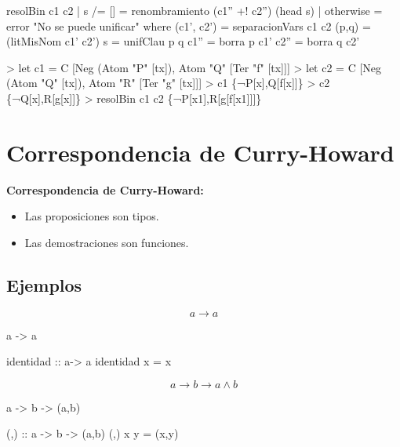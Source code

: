 \documentclass{beamer}
\begin{document}
\begin{frame}[fragile]
\begin{code}
resolBin c1 c2 
    | s /= [] = renombramiento (c1'' +! c2'') (head s)
    | otherwise = error "No se puede unificar"
    where
      (c1', c2') = separacionVars c1 c2
      (p,q) = (litMisNom c1' c2')
      s = unifClau p q
      c1'' = borra p c1'
      c2'' = borra q c2'
\end{code}  
\end{frame}

\begin{frame}[fragile]
\begin{sesion}
> let c1 = C [Neg (Atom "P" [tx]), Atom "Q" [Ter "f" [tx]]]
> let c2 = C [Neg (Atom "Q" [tx]), Atom "R" [Ter "g" [tx]]]
> c1
\{¬P[x],Q[f[x]]\}
> c2
\{¬Q[x],R[g[x]]\}
> resolBin c1 c2
\{¬P[x1],R[g[f[x1]]]\}
\end{sesion}

\end{frame}
\section{Correspondencia de Curry-Howard}
\begin{frame}
  \textbf{Correspondencia de Curry-Howard:}
\vspace{5mm}
  \begin{itemize}
  \item Las proposiciones son tipos.
  \item Las demostraciones son funciones.
  \end{itemize}
\end{frame}


\subsection{Ejemplos}
\begin{frame}[fragile]  
  $$a \rightarrow a$$
\pause
\begin{sesion}
a -> a
\end{sesion}
\pause
\begin{code}
identidad :: a-> a
identidad x = x
\end{code}  

\end{frame}

\begin{frame}[fragile]
  $$a \rightarrow b \rightarrow a\wedge b $$
\pause

\begin{sesion}
a -> b -> (a,b)
\end{sesion}
\pause

\begin{code}
(,) :: a -> b -> (a,b)
(,) x y = (x,y)
\end{code}

\end{frame}
\end{document}
